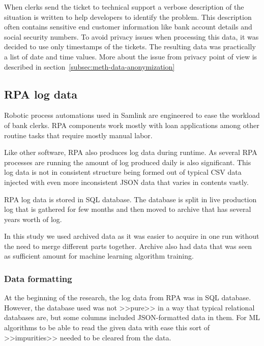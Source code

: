When clerks send the ticket to technical support
a verbose description of the situation is written
to help developers to identify the problem.
This description often contains sensitive end customer information
like bank account details and social security numbers.
To avoid privacy issues when processing this data,
it was decided to use only timestamps of the tickets.
The resulting data was practically a list of date and time values.
More about the issue from privacy point of view
is described in section~\ref{subsec:meth-data-anonymization}


\subsection{RPA log data}\label{subsec:meth-rpa-log-data}
Robotic process automations used in Samlink
are engineered %
to ease the workload of
bank clerks.
RPA components %
work mostly with loan applications %
among other routine tasks
that require mostly manual labor.

Like other software,
RPA also produces log data during runtime.
As several RPA processes are running %
the amount of log produced daily is also significant. %
This log data is not in consistent structure
being formed out of typical CSV data
injected with even more inconsistent JSON data
that varies in contents vastly.

RPA log data is stored in SQL database.
The database is split in live production log
that is gathered for few months %
and then moved to archive that has
several years worth of log.

In this study we used archived data
as it was easier to acquire in one run
without the need to merge different parts together.
Archive also had %
data that was seen as sufficient amount
for machine learning algorithm training.

\subsubsection*{Data formatting}\label{subsubsec:data-formatting}
At the beginning of the research,
the log data from RPA was in SQL database.
However,
the database used was not >>pure>>
in a way that typical relational databases are,
but some columns included JSON-formatted data in them.
For ML algorithms to be able to read the given data with ease
this sort of >>impurities>> needed to be cleared from the data.


